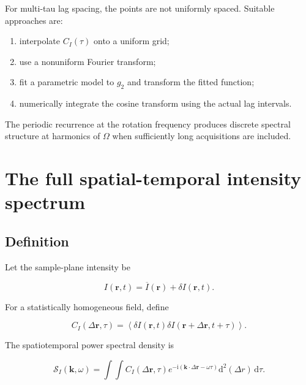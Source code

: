 \documentclass[11pt]{article}
\newcommand{\avg}[1]{\left\langle #1 \right\rangle}
\renewcommand{\dd}{\mathrm{d}}
\newcommand{\ii}{\mathrm{i}}
\newcommand{\SII}{\mathcal{S}_{I}}
\newcommand{\kvec}{\mathbf{k}}
\newcommand{\rvec}{\mathbf{r}}
\begin{document}
For multi-tau lag spacing, the points are not uniformly spaced. Suitable
approaches are:

\begin{enumerate}[label=\arabic*.]
    \item interpolate $C_I(\tau)$ onto a uniform grid;
    \item use a nonuniform Fourier transform;
    \item fit a parametric model to $g_2$ and transform the fitted function;
    \item numerically integrate the cosine transform using the actual lag
    intervals.
\end{enumerate}

The periodic recurrence at the rotation frequency produces discrete spectral
structure at harmonics of $\Omega$ when sufficiently long acquisitions are
included.

\section{The full spatial-temporal intensity spectrum}

\subsection{Definition}

Let the sample-plane intensity be

\begin{equation}
    I(\rvec,t)
    =
    \overline{I}(\rvec)
    +
    \delta I(\rvec,t).
\end{equation}

For a statistically homogeneous field, define

\begin{equation}
    C_I(\Delta\rvec,\tau)
    =
    \avg{
        \delta I(\rvec,t)
        \delta I(\rvec+\Delta\rvec,t+\tau)
    }.
    \label{eq:space_time_corr}
\end{equation}

The spatiotemporal power spectral density is

\begin{equation}
\boxed{
    \SII(\kvec,\omega)
    =
    \int
    \int
    C_I(\Delta\rvec,\tau)
    e^{-\ii(\kvec\cdot\Delta\rvec-\omega\tau)}
    \dd^2(\Delta r)\,\dd\tau.
}
\label{eq:full_spectrum}
\end{equation}
\end{document}
